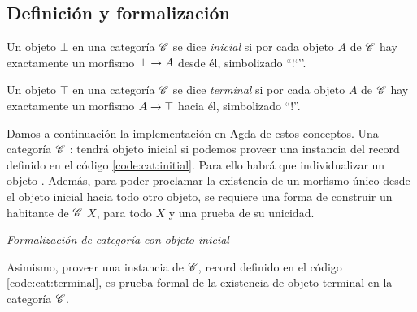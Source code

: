 \subsection{Definición y formalización}
\begin{definition}\label{cat:initial}

 Un objeto $\bot$ en una categoría $\mathscr{C}$ se dice {\it inicial} si por cada objeto $A$ de $\mathscr{C}$ hay exactamente un morfismo $ \bot\xrightarrow{}A$ desde él, simbolizado ``!`''.
\begin{center}
  \xymatrixcolsep{3pc}
  \centerline{}
\end{center}

\end{definition}

\begin{definition}\label{cat:term}

 Un objeto $\top$ en una categoría $\mathscr{C}$ se dice {\it terminal} si por cada objeto $A$ de $\mathscr{C}$ hay exactamente un morfismo $ A\xrightarrow{}\top$ hacia él, simbolizado ``!''.
\begin{center}
  \xymatrixcolsep{3pc}
  \centerline{}
\end{center}

\end{definition}


Damos a continuación la implementación en Agda de estos conceptos. Una categoría $\mathscr{C}$ :  tendrá objeto inicial si podemos proveer una instancia del record definido en el código \ref{code:cat:initial}.  Para ello habrá que individualizar un objeto . Además, para poder proclamar la existencia de un morfismo único desde el objeto inicial hacia todo otro objeto, se requiere una forma de construir un habitante de  $\mathscr{C}$  $X$, para todo $X$ y una prueba de su unicidad.

\begin{agdacode}{\it Formalización de categoría con objeto inicial}\hspace{3ex}\label{code:cat:initial}
  
\end{agdacode}

Asimismo, proveer una instancia de  $\mathscr{C}$, record definido en el código \ref{code:cat:terminal}, es prueba formal de la existencia de objeto terminal en la categoría $\mathscr{C}$.

